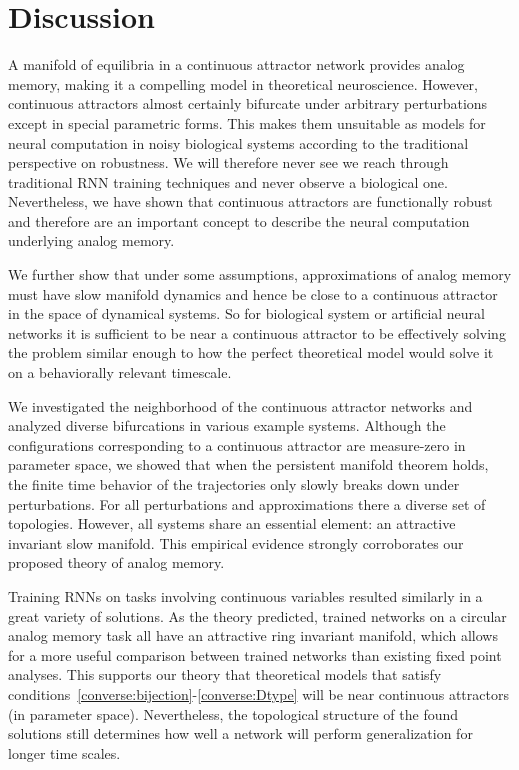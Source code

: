 \documentclass{article} %
\newcounter{ct}
\theoremstyle{definition}
\theoremstyle{remark}
\begin{document}
\section{Discussion}
A manifold of equilibria in a continuous attractor network provides analog memory, making it a compelling model in theoretical neuroscience.
However, continuous attractors almost certainly bifurcate under arbitrary perturbations except in special parametric forms.
This makes them unsuitable as models for neural computation in noisy biological systems according to the traditional perspective on robustness.
We will therefore never see we reach through traditional RNN training techniques and never observe a biological one.
Nevertheless, we have shown that continuous attractors are functionally robust and therefore are an important concept to describe the neural computation underlying analog memory.

We further show that under some assumptions, approximations of analog memory must have slow manifold dynamics and hence be close to a continuous attractor in the space of dynamical systems.
So for biological system or artificial neural networks it is sufficient to be near a continuous attractor to be effectively solving the problem similar enough to how the perfect theoretical model would solve it on a behaviorally relevant timescale.


We investigated the neighborhood of the continuous attractor networks and analyzed diverse bifurcations in various example systems.
Although the configurations corresponding to a continuous attractor are measure-zero in parameter space, we showed that when the persistent manifold theorem holds, the finite time behavior of the trajectories only slowly breaks down under perturbations.
For all perturbations and approximations there a diverse set of topologies.
However, all systems share an essential element: an attractive invariant slow manifold.
This empirical evidence strongly corroborates our proposed theory of analog memory.

Training RNNs on tasks involving continuous variables resulted similarly in a great variety of solutions.
As the theory predicted, trained networks on a circular analog memory task all have an attractive ring invariant manifold, which allows for a more useful comparison between trained networks than existing fixed point analyses.
This supports our theory that theoretical models that satisfy conditions~\ref{converse:bijection}-\ref{converse:Dtype} will be near continuous attractors (in parameter space).
Nevertheless, the topological structure of the found solutions still determines how well a network will perform generalization for longer time scales.
\end{document}
